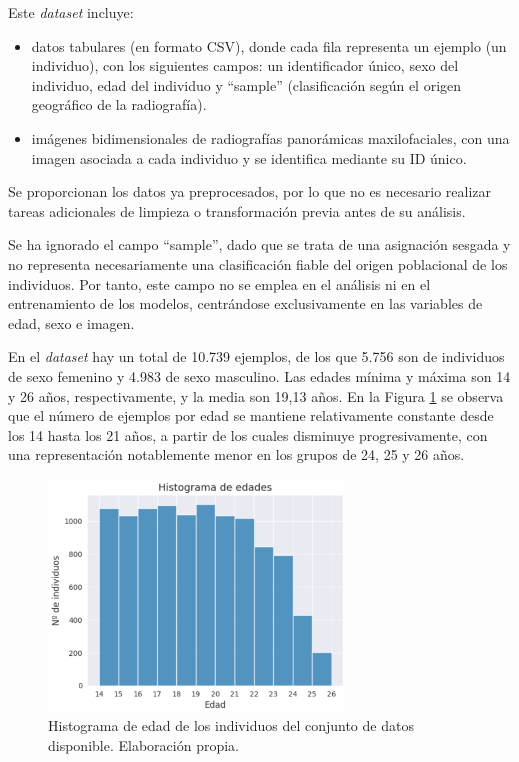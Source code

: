 Este \textit{dataset} incluye:

\begin{itemize}

    \item datos tabulares (en formato CSV), donde cada fila representa un ejemplo (un individuo), con los 
    siguientes campos: un identificador único, sexo del individuo, edad del individuo y ``sample'' 
    (clasificación según el origen geográfico de la radiografía).

    \item imágenes bidimensionales de radiografías panorámicas maxilofaciales, con una imagen asociada 
    a cada individuo y se identifica mediante su ID único. 

\end{itemize}

Se proporcionan los datos ya preprocesados, por lo que no es necesario realizar tareas adicionales de limpieza 
o transformación previa antes de su análisis.

Se ha ignorado el campo ``sample'', dado que se trata de una asignación sesgada y no representa 
necesariamente una clasificación fiable del origen poblacional de los individuos. Por tanto, este campo no 
se emplea en el análisis ni en el entrenamiento de los modelos, centrándose exclusivamente en las variables 
de edad, sexo e imagen.

En el \textit{dataset} hay un total de 10.739 ejemplos, de los que 5.756 son de individuos de sexo femenino 
y 4.983 de sexo masculino. 
Las edades mínima y máxima son 14 y 26 años, respectivamente, y la media son 19,13 años.
En la Figura \ref{fig:histogram_ages} se observa que el número de ejemplos por edad se mantiene relativamente 
constante desde los 14 hasta los 21 años, a partir de los cuales disminuye progresivamente, con una 
representación notablemente menor en los grupos de 24, 25 y 26 años.
 
\begin{figure}[h]
    \centering
    \includegraphics[width=0.7\textwidth]{capitulos/cap_04/imagenes/histogram_ages.png}
    \caption[
        Histograma de edad de los individuos del conjunto de datos disponible.
    ]{
        Histograma de edad de los individuos del conjunto de datos disponible. 
        Elaboración propia.
    } 
    \label{fig:histogram_ages}
\end{figure}

